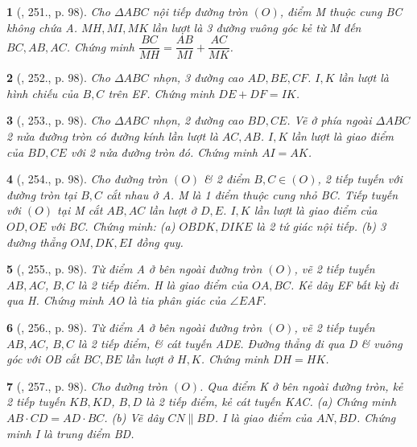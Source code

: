 \documentclass{article}
\newtheorem{baitoan}{}
\begin{document}
\begin{baitoan}[\cite{Binh_Toan_9_tap_2}, 251., p. 98]
	Cho $\Delta ABC$ nội tiếp đường tròn $(O)$, điểm M thuộc cung BC không chứa A. $MH,MI,MK$ lần lượt là 3 đường vuông góc kẻ từ M đến $BC,AB,AC$. Chứng minh $\dfrac{BC}{MH} = \dfrac{AB}{MI} + \dfrac{AC}{MK}$.
\end{baitoan}

\begin{baitoan}[\cite{Binh_Toan_9_tap_2}, 252., p. 98]
	Cho $\Delta ABC$ nhọn, 3 đường cao $AD,BE,CF$. $I,K$ lần lượt là hình chiếu của $B,C$ trên EF. Chứng minh $DE + DF = IK$.
\end{baitoan}

\begin{baitoan}[\cite{Binh_Toan_9_tap_2}, 253., p. 98]
	Cho $\Delta ABC$ nhọn, 2 đường cao $BD,CE$. Vẽ ở phía ngoài $\Delta ABC$ 2 nửa đường tròn có đường kính lần lượt là $AC,AB$. $I,K$ lần lượt là giao điểm của $BD,CE$ với 2 nửa đường tròn đó. Chứng minh $AI = AK$.
\end{baitoan}

\begin{baitoan}[\cite{Binh_Toan_9_tap_2}, 254., p. 98]
	Cho đường tròn $(O)$ \& 2 điểm $B,C\in(O)$, 2 tiếp tuyến với đường tròn tại $B,C$ cắt nhau ở A. M là 1 điểm thuộc cung nhỏ BC. Tiếp tuyến với $(O)$ tại M cắt $AB,AC$ lần lượt ở $D,E$. $I,K$ lần lượt là giao điểm của $OD,OE$ với BC. Chứng minh: (a) $OBDK,DIKE$ là 2 tứ giác nội tiếp. (b) 3 đường thẳng $OM,DK,EI$ đồng quy.
\end{baitoan}

\begin{baitoan}[\cite{Binh_Toan_9_tap_2}, 255., p. 98]
	Từ điểm A ở bên ngoài đường tròn $(O)$, vẽ 2 tiếp tuyến $AB,AC$, $B,C$ là 2 tiếp điểm. H là giao điểm của $OA,BC$. Kẻ dây EF bất kỳ đi qua H. Chứng minh AO là tia phân giác của $\angle{EAF}$.
\end{baitoan}

\begin{baitoan}[\cite{Binh_Toan_9_tap_2}, 256., p. 98]
	Từ điểm A ở bên ngoài đường tròn $(O)$, vẽ 2 tiếp tuyến $AB,AC$, $B,C$ là 2 tiếp điểm, \& cát tuyến ADE. Đường thẳng đi qua D \& vuông góc với OB cắt $BC,BE$ lần lượt ở $H,K$. Chứng minh $DH = HK$.
\end{baitoan}

\begin{baitoan}[\cite{Binh_Toan_9_tap_2}, 257., p. 98]
	Cho đường tròn $(O)$. Qua điểm K ở bên ngoài đường tròn, kẻ 2 tiếp tuyến $KB,KD$, $B,D$ là 2 tiếp điểm, kẻ cát tuyến KAC. (a) Chứng minh $AB\cdot CD = AD\cdot BC$. (b) Vẽ dây $CN\parallel BD$. I là giao điểm của $AN,BD$. Chứng minh I là trung điểm BD.
\end{baitoan}
\end{document}
